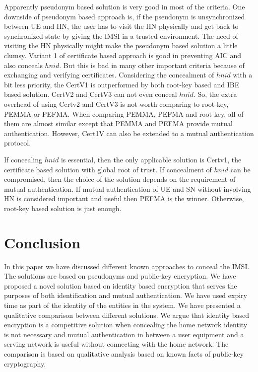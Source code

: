 \documentclass{river-journal}
\begin{document}
Apparently pseudonym based solution is very good in most of the criteria. One downside of pseudonym based approach is, if the pseudonym is unsynchronized between UE and HN, the user has to visit the HN physically and get back to synchronized state by giving the IMSI in a trusted environment. The need of visiting the HN physically might make the pseudonym based solution a little clumsy. Variant 1 of certificate based approach is good in preventing AIC and also conceals $hnid$. But this is bad in many other important criteria because of exchanging and verifying certificates. Considering the concealment of $hnid$ with a bit less priority, the CertV1 is outperformed by both root-key based and IBE based solution. CertV2 and CertV3 can not even conceal $hnid$. So, the extra overhead of using Certv2 and CertV3 is not worth comparing to root-key, PEMMA or PEFMA. When comparing PEMMA, PEFMA and root-key, all of them are almost similar except that PEMMA and PEFMA provide mutual authentication. However, Cert1V can also be extended to a mutual authentication protocol. 

If concealing $hnid$ is essential, then the only applicable solution is Certv1, the certificate based solution with global root of trust. If concealment of $hnid$ can be compromised, then the choice  of the solution depends on the requirement of mutual authentication. If mutual authentication of UE and SN without involving HN is considered important and useful then PEFMA is the winner. Otherwise, root-key based solution is just enough.


\section{Conclusion}
\label{sec:conclusion}In this paper we have discussed different known approaches to conceal the IMSI. The solutions  are based on pseudonyms and public-key encryption. We have proposed a novel solution based on identity based encryption that serves the purposes of both identification and mutual authentication. We have used expiry time as part of the identity of the entities in the system. We have presented a qualitative comparison between different  solutions. We argue that identity based encryption is a competitive solution when concealing the home network identity is not necessary and mutual authentication in between a user equipment and a serving network is useful without connecting with the home network. The comparison is based on qualitative analysis based on known facts of public-key cryptography.
\end{document}
